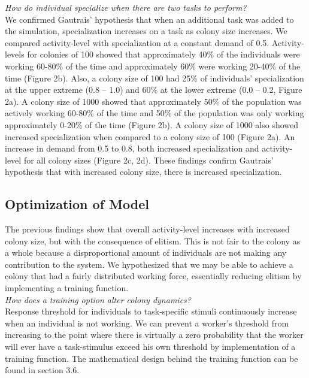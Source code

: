 \documentclass[a4paper]{article}
\begin{document}
\noindent\textit{How do individual specialize when there are two tasks to perform?}\\
\indent We confirmed Gautrais’ hypothesis that when an additional task was added to the simulation, specialization increases on a task as colony size increases.  We compared activity-level with specialization at a constant demand of 0.5. Activity-levels for colonies of 100 showed that approximately 40\% of the individuals were working 60-80\% of the time and approximately 60\% were working 20-40\% of the time (Figure 2b).  Also, a colony size of 100 had 25\% of individuals’ specialization at the upper extreme (0.8 – 1.0) and 60\% at the lower extreme (0.0 – 0.2, Figure 2a). A colony size of 1000 showed that approximately 50\% of the population was actively working 60-80\% of the time and 50\% of the population was only working approximately 0-20\% of the time (Figure 2b). A colony size of 1000 also showed increased specialization when compared to a colony size of 100 (Figure 2a).  An increase in demand from 0.5 to 0.8, both increased specialization and activity-level for all colony sizes (Figure 2c, 2d).  These findings confirm Gautrais’ hypothesis that with increased colony size, there is increased specialization.


\subsection{Optimization of Model}
The previous findings show that overall activity-level increases with increased colony size, but with the consequence of elitism.  This is not fair to the colony as a whole because a disproportional amount of individuals are not making any contribution to the system.  We hypothesized that we may be able to achieve a colony that had a fairly distributed working force, essentially reducing elitism by implementing a training function.\\  


\noindent\textit{How does a training option alter colony dynamics?}\\
\indent Response threshold for individuals to task-specific stimuli continuously increase when an individual is not working.  We can prevent a worker’s threshold from increasing to the point where there is virtually a zero probability that the worker will ever have a task-stimulus exceed his own threshold by implementation of a training function.  The mathematical design behind the training function can be found in section 3.6.\\
\end{document}
